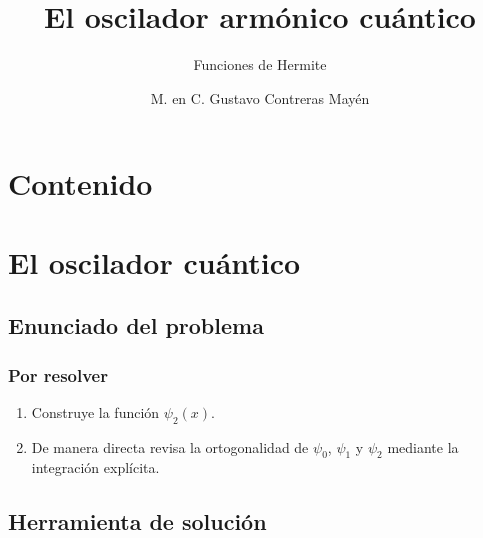 \documentclass[12pt]{beamer}
\date{}
\title{\large{El oscilador armónico cuántico}}
\subtitle{Funciones de Hermite}
\author{M. en C. Gustavo Contreras Mayén}
\begin{document}
\maketitle
\fontsize{14}{14}\selectfont
{}

\section*{Contenido}

\section{El oscilador cuántico}
\subsection{Enunciado del problema}

\begin{frame}
\frametitle{Por resolver}
\begin{enumerate}[<+->]
\item Construye la función $\psi_{2} (x)$.
\item De manera directa revisa la ortogonalidad de $\psi_{0}$, $\psi_{1}$ y $\psi_{2}$ mediante la integración explícita.
\end{enumerate}
\end{frame}

\subsection{Herramienta de solución}
\end{document}
